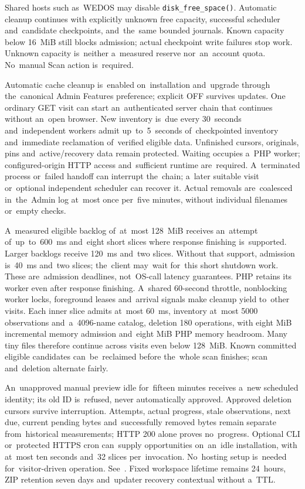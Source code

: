 \documentclass[11pt,a4paper]{article}
\newcommand{\filepath}[1]{\path{#1}}
\newcommand{\codeword}[1]{\nolinkurl{#1}}
\begin{document}
Shared hosts such as~WEDOS may disable \codeword{disk_free_space()}. Automatic
cleanup continues with explicitly unknown free capacity, successful scheduler
and~candidate checkpoints, and~the~same bounded journals. Known capacity below
16~MiB still blocks admission; actual checkpoint write failures stop work.
Unknown capacity is~neither a~measured reserve nor~an~account quota. No~manual
Scan action is~required.

Automatic cache cleanup is~enabled on~installation and~upgrade through
the~canonical Admin Features preference; explicit OFF survives updates. One
ordinary GET visit can start an~authenticated server chain that continues
without an~open browser. New inventory is~due every 30~seconds and~independent
workers admit up~to~5~seconds of~checkpointed inventory and~immediate
reclamation of~verified eligible data. Unfinished cursors, originals, pins
and~active/recovery data remain protected. Waiting occupies a~PHP worker;
configured-origin HTTP access and~sufficient runtime are~required. A~terminated
process or~failed handoff can interrupt the~chain; a~later suitable visit
or~optional independent scheduler can recover it. Actual removals are~coalesced
in~the~Admin log at~most once per~five minutes, without individual filenames
or~empty checks.

A~measured eligible backlog of~at~most 128~MiB receives an~attempt
of~up~to~600~ms and~eight short slices where response finishing is~supported.
Larger backlogs receive 120~ms and~two slices. Without that support, admission
is~40~ms and~two slices; the~client may~wait for~this short shutdown work. These
are~admission deadlines, not~OS-call latency guarantees. PHP retains its worker
even after response finishing. A~shared 60-second throttle, nonblocking worker
locks, foreground leases and~arrival signals make cleanup yield to~other visits.
Each inner slice admits at~most 60~ms, inventory at~most 5000 observations
and~a~4096-name catalog, deletion 180 operations, with eight MiB incremental
memory admission and~eight MiB PHP memory headroom. Many tiny files therefore
continue across visits even below 128~MiB. Known committed eligible candidates
can~be~reclaimed before the~whole scan finishes; scan and~deletion alternate
fairly.

An~unapproved manual preview idle for~fifteen minutes receives a~new scheduled
identity; its old ID is~refused, never automatically approved. Approved deletion
cursors survive interruption. Attempts, actual progress, stale observations,
next due, current pending bytes and~successfully removed bytes remain separate
from~historical measurements; HTTP 200 alone proves no~progress. Optional CLI
or~protected HTTPS cron can~supply opportunities on~an~idle installation, with
at~most ten seconds and~32 slices per~invocation. No~hosting setup is~needed
for~visitor-driven operation. See~\filepath{docs/CACHE_MAINTENANCE.md}. Fixed
workspace lifetime remains 24~hours, ZIP retention seven days and~updater
recovery contextual without a~TTL.
\end{document}
